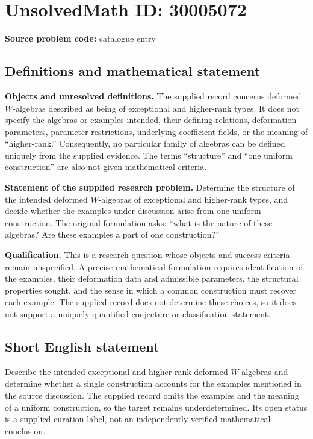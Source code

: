 \documentclass[11pt]{article}
\begin{document}
\section*{UnsolvedMath ID: 30005072}
\textbf{Source problem code:} catalogue entry
\subsection{Definitions and mathematical statement}
\textbf{Objects and unresolved definitions.} The supplied record concerns deformed \(W\)-algebras described as being of exceptional and higher-rank types. It does not specify the algebras or examples intended, their defining relations, deformation parameters, parameter restrictions, underlying coefficient fields, or the meaning of ``higher-rank.'' Consequently, no particular family of algebras can be defined uniquely from the supplied evidence. The terms ``structure'' and ``one uniform construction'' are also not given mathematical criteria.

\textbf{Statement of the supplied research problem.} Determine the structure of the intended deformed \(W\)-algebras of exceptional and higher-rank types, and decide whether the examples under discussion arise from one uniform construction. The original formulation asks: ``what is the nature of these algebras? Are these examples a part of one construction?''

\textbf{Qualification.} This is a research question whose objects and success criteria remain unspecified. A precise mathematical formulation requires identification of the examples, their deformation data and admissible parameters, the structural properties sought, and the sense in which a common construction must recover each example. The supplied record does not determine these choices, so it does not support a uniquely quantified conjecture or classification statement.
\subsection{Short English statement}
Describe the intended exceptional and higher-rank deformed \(W\)-algebras and determine whether a single construction accounts for the examples mentioned in the source discussion. The supplied record omits the examples and the meaning of a uniform construction, so the target remains underdetermined. Its open status is a supplied curation label, not an independently verified mathematical conclusion.
\end{document}
